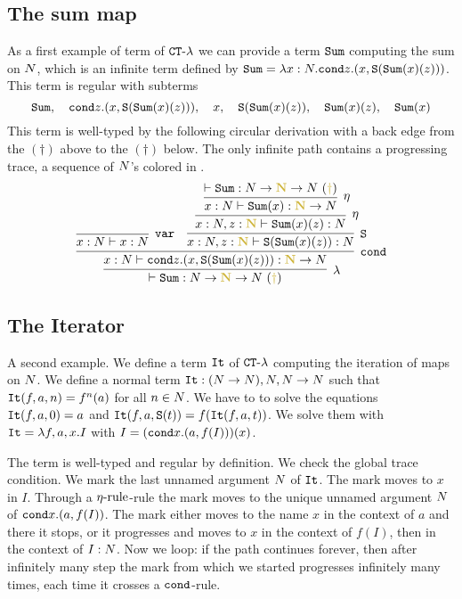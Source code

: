 \documentclass{article}
\begin{document}
\subsection{The sum map}
As a first example of term of  ${ {\tt CT} \mbox{-} \lambda}$ we can provide a term ${\tt Sum}$ computing the sum on ${N}$,
which is an infinite term defined by ${\tt Sum} = \lambda x:{N}.{\tt cond} z.(x,{\tt S}({\tt Sum}(x)(z)))$.
This term is regular with subterms 
$$
\Sum, \  \  \ \cond z.(x,\Succ(\Sum(x)(z))), 
\  \  \ x, \  \  \ \Succ(\Sum(x)(z)),  \  \  \ \Sum(x)(z), \  \  \ \Sum(x)
$$
This term is well-typed by the following circular derivation with a back edge from the $(\dagger)$ above to the $(\dagger)$ below.
The only infinite path contains a progressing trace, a sequence of ${N}$'s colored in 
. 
\[
\infer[\lambda]{
  \vdash \Sum:\N \rightarrow \bfColor{oldgold}{\N} \rightarrow \N\ 
(\bfColor{oldgold}{\dagger})
}{
  \infer[\cond]{
    x:\N \vdash \cond z.(x,\Succ(\Sum(x)(z))): \bfColor{oldgold}{\N} \rightarrow \N
  }{
    \infer[\var]{
      x:\N \vdash x:\N
    }{}
    &
    \infer[\Succ]{
      x:\N,z:\bfColor{oldgold}{\N} \vdash \Succ(\Sum(x)(z)): \N
    }{
      \infer[\eta]{
        x:\N,z:\bfColor{oldgold}{\N} \vdash \Sum(x)(z): \N
      }{
        \infer[\eta]{
          x:\N \vdash \Sum(x): \bfColor{oldgold}{\N} \rightarrow \N
        }{
          \vdash \Sum: \N \rightarrow \bfColor{oldgold}{\N} \rightarrow \N\ 
(\bfColor{oldgold}{\dagger})
        }
      }
    }
  }
}
\]



\subsection{The Iterator}
A second example. We define a term ${\tt It}$ of  ${ {\tt CT} \mbox{-} \lambda}$ computing the iteration of maps on ${N}$.
We define a normal term ${\tt It}:({N} \rightarrow {N}), {N},{N} \rightarrow {N}$ such that
${\tt It}(f,a,n)=f^n(a)$ for all $n \in {N}$. 
We have to to solve the equations ${\tt It}(f,a,0) = a$ and ${\tt It}(f,a,{\tt S} (t)) = f({\tt It}(f,a,t))$.
We solve them with ${\tt It} = \lambda f, a, x.I$
with $I = ({\tt cond} x. (a, f(I) ))(x)$.

The term is well-typed and regular by definition. We check the global trace condition. 
We mark the last unnamed argument ${N}$ of ${\tt It}$. The mark moves to $x$ in $I$.
 Through a ${\eta\mbox{-rule}}$-rule the mark moves to the unique unnamed argument ${N}$ of  
$ {\tt cond} x. (a, f(I) )$.
The mark either moves to the name $x$ in the context of $a$ and there it stops, or 
it progresses and moves to $x$ in the context of $f(I)$, then in the context of $I:{N}$.
Now we loop: if the path continues forever, then after infinitely many step the mark from which we started 
progresses infinitely many times, each time it crosses a ${\tt cond}$-rule.
\end{document}
